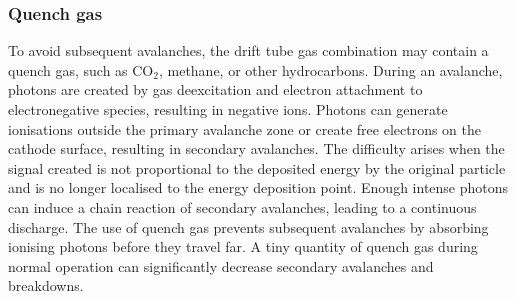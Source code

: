 \subsubsection{Quench gas}
To avoid subsequent avalanches, the drift tube gas combination may contain a quench gas, such as CO$_2$, 
methane, or other hydrocarbons. During an avalanche, photons are created by gas deexcitation and electron 
attachment to electronegative species, resulting in negative ions. Photons can generate ionisations 
outside the primary avalanche zone or create free electrons on the cathode surface, resulting in secondary avalanches.
The difficulty arises when the signal created is not proportional to the deposited energy by the original particle 
and is no longer localised to the energy deposition point. Enough intense photons can induce a chain reaction of 
secondary avalanches, leading to a continuous discharge. The use of quench gas prevents subsequent 
avalanches by absorbing ionising photons before they travel far. A tiny quantity of quench gas during normal operation 
can significantly decrease secondary avalanches and breakdowns.
